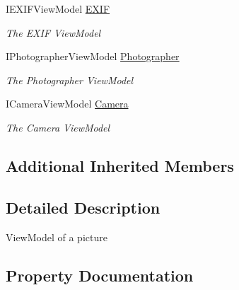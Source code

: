 \begin{DoxyCompactItemize}
I\+E\+X\+I\+F\+View\+Model \mbox{\hyperlink{class_pic_d_b_1_1_view_models_1_1_picture_view_model_a1963773b15fb44ed9f1b285c7dbb2ed1}{E\+X\+IF}}
\begin{DoxyCompactList}\small\item\em The E\+X\+IF View\+Model \end{DoxyCompactList}\item 
I\+Photographer\+View\+Model \mbox{\hyperlink{class_pic_d_b_1_1_view_models_1_1_picture_view_model_aea991b658ad8d03f499fab158ff97b3e}{Photographer}}
\begin{DoxyCompactList}\small\item\em The Photographer View\+Model \end{DoxyCompactList}\item 
I\+Camera\+View\+Model \mbox{\hyperlink{class_pic_d_b_1_1_view_models_1_1_picture_view_model_ad915e09a63dfe43eb4d324e0df024473}{Camera}}
\begin{DoxyCompactList}\small\item\em The Camera View\+Model \end{DoxyCompactList}\end{DoxyCompactItemize}
\subsection*{Additional Inherited Members}


\subsection{Detailed Description}
View\+Model of a picture 



\subsection{Property Documentation}
\mbox{\label{class_pic_d_b_1_1_view_models_1_1_picture_view_model_ad915e09a63dfe43eb4d324e0df024473}} 
